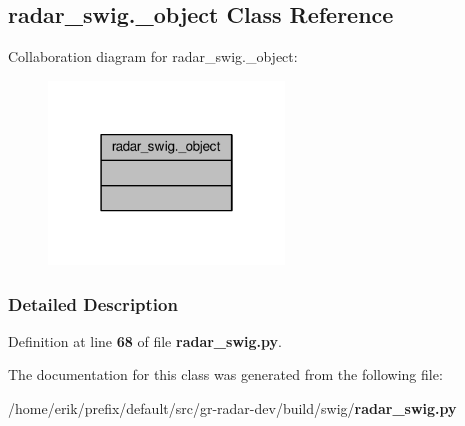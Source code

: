 \subsection{radar\+\_\+swig.\+\_\+object Class Reference}
\label{classradar__swig_1_1__object}


Collaboration diagram for radar\+\_\+swig.\+\_\+object\+:
\nopagebreak
\begin{figure}[H]
\begin{center}
\leavevmode
\includegraphics[width=178pt]{de/df0/classradar__swig_1_1__object__coll__graph}
\end{center}
\end{figure}


\subsubsection{Detailed Description}


Definition at line {\bf 68} of file {\bf radar\+\_\+swig.\+py}.



The documentation for this class was generated from the following file\+:\begin{DoxyCompactItemize}
\item 
/home/erik/prefix/default/src/gr-\/radar-\/dev/build/swig/{\bf radar\+\_\+swig.\+py}\end{DoxyCompactItemize}
